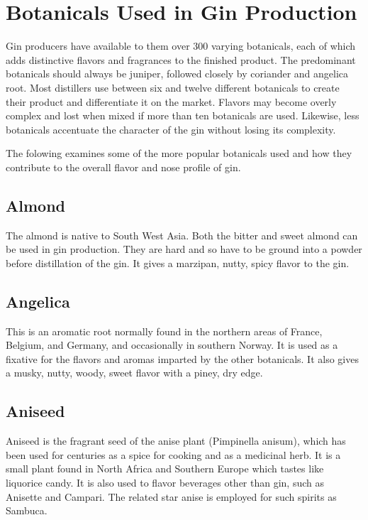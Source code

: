 \section{Botanicals Used in Gin Production} Gin producers have available to
them over 300 varying botanicals, each of which adds distinctive flavors and
fragrances to the finished product. The predominant botanicals should always be
juniper, followed closely by coriander and angelica root. Most distillers use
between six and twelve different botanicals to create their product and
differentiate it on the market. Flavors may become overly complex and lost when
mixed if more than ten botanicals are used. Likewise, less botanicals
accentuate the character of the gin without losing its complexity.

The folowing examines some of the more popular botanicals used and how they
contribute to the overall flavor and nose profile of gin.

\subsection*{Almond} The almond is native to South West Asia. Both
the bitter and sweet almond can be used in gin production. They are hard and so
have to be ground into a powder before distillation of the gin. It gives a
marzipan, nutty, spicy flavor to the gin.  

\subsection*{Angelica} This is an aromatic root normally found
in the northern areas of France, Belgium, and Germany, and occasionally in
southern Norway. It is used as a fixative for the flavors and aromas imparted
by the other botanicals. It also gives a musky, nutty, woody, sweet flavor with
a piney, dry edge.  

\subsection*{Aniseed} Aniseed is the fragrant seed of the anise
plant (Pimpinella anisum), which has been used for centuries as a spice for
cooking and as a medicinal herb. It is a small plant found in North Africa and
Southern Europe which tastes like liquorice candy. It is also used to flavor
beverages other than gin, such as Anisette and Campari. The related star anise
is employed for such spirits as Sambuca. 

